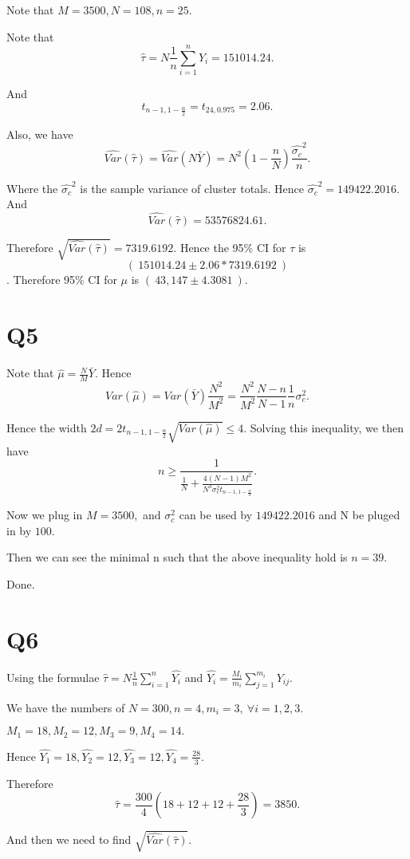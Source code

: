 \documentclass[12pt]{article}%
\begin{document}
Note that $M=3500, N=108, n=25.$ 

Note that $$\hat{\tau}=N\frac{1}{n}\sum_{i=1}^{n}Y_i=151014.24.$$

And $$t_{n-1,1-\frac{\alpha}{2}}=t_{24,0.975}=2.06.$$

Also, we have $$\hat{Var}(\hat{\tau})=\hat{Var}(N\bar{Y})=N^2(1-\frac{n}{N})\frac{\hat{\sigma_c}^2}{n}.$$

Where the $\hat{\sigma_c}^2$ is the sample variance of cluster totals. Hence $\hat{\sigma_c}^2=149422.2016.$ And $$\hat{Var}(\hat{\tau})=53576824.61.$$

Therefore $\sqrt{\hat{Var}(\hat{\tau})}=7319.6192.$ Hence the 95\% CI for $\tau$ is $$(~151014.24 \pm 2.06*7319.6192~)$$. Therefore 95\% CI for $\mu$ is $(~43,147 \pm 4.3081~).$


\section{Q5}
Note that $\hat{\mu}=\frac{N}{M}\bar{Y}.$ Hence $$Var(\hat{\mu})=Var(\bar{Y})\frac{N^2}{M^2}=\frac{N^2}{M^2}\frac{N-n}{N-1}\frac{1}{n}\sigma_c^2.$$

Hence the width $2d=2t_{n-1,1-\frac{\alpha}{2}}\sqrt{Var(\hat{\mu})} \leq 4.$ Solving this inequality, we then have $$n \geq \frac{1}{\frac{1}{N} + \frac{4(N-1)M^2}{N^3 \sigma_c^2 t_{n-1,1-\frac{\alpha}{2}}} }.$$ 

Now we plug in $M=3500,$ and $\sigma_c^2$ can be used by $149422.2016$ and N be pluged in by $100$. 

Then we can see the minimal n such that the above inequality hold is $n=39$.

Done. 


\section{Q6}
Using the formulae $\hat{\tau}=N\frac{1}{n} \sum_{i=1}^{n}\hat{Y_i}$ and $\hat{Y_i}=\frac{M_i}{m_i}\sum_{j=1}^{m_i}Y_{ij}.$ 

We have the numbers of $N=300, n=4, m_i=3,~ \forall i=1,2,3.$

$M_1 = 18, M_2 = 12, M_3 = 9, M_4 = 14.$

Hence $\hat{Y_1} = 18, \hat{Y_2} = 12, \hat{Y_3} = 12, \hat{Y_4} = \frac{28}{3}.$

Therefore $$\hat{\tau} = \frac{300}{4}(18+12+12+\frac{28}{3})=3850.$$ 

And then we need to find $\sqrt{\hat{Var}(\hat{\tau})}.$
\end{document}
